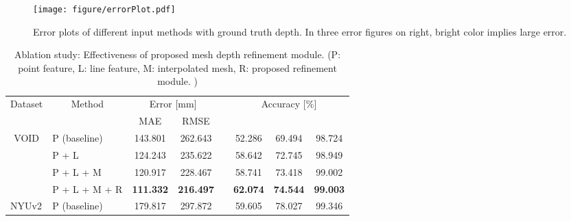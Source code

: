 \begin{figure}[t!]
\centering
    \texttt{[image: figure/errorPlot.pdf]}
    \caption{Error plot\textcolor{color1}{s} of different input method\textcolor{color1}{s} with ground truth depth. In three error figures on right, \textcolor{color1}{bright color implies large} error.} 
    \label{fig:error_plot}
    \vspace{-0.3cm}
\end{figure} 
\begin{table}[t!]
\centering
\renewcommand{\arraystretch}{1.1} \renewcommand{\tabcolsep}{1.1mm}  \caption{Ablation study: Effectiveness of \textcolor{color1}{p}roposed \textcolor{color1}{m}esh \textcolor{color1}{d}epth \textcolor{color1}{r}efinement module. 
(P: point feature, L: line feature, M: interpolated mesh, R: \textcolor{color1}{p}roposed refinement module.
)}
\begin{tabular}[ht]{clcccccc}
\hline
\multirow{2}{*}{Dataset}                   & \multicolumn{1}{c}{\multirow{2}{*}{Method}} & \multicolumn{2}{c}{Error {[}mm{]} } &  & \multicolumn{3}{c}{Accuracy {[}\%{]} }    \\ \cline{3-4} \cline{6-8} 
                                          & \multicolumn{1}{c}{}                        & MAE                    & RMSE                   &  &       &       &       \\ \hline
\multirow{4}{*}{VOID}                      & P (baseline)                                & 143.801                & 262.643                &  & 52.286          & 69.494          & 98.724          \\
                                          & P + L                                       & 124.243                & 235.622                &  & 58.642          & 72.745          & 98.949          \\
                                          & P + L + M                                   & 120.917                & 228.467                &  & 58.741          & 73.418          & 99.002          \\
                                          & P + L + M + R                               & \textbf{111.332}       & \textbf{216.497}       &  & \textbf{62.074} & \textbf{74.544} & \textbf{99.003} \\ \hline
\multicolumn{1}{l}{\multirow{4}{*}{NYUv2}} & P (baseline)                                & 179.817                & 297.872                &  & 59.605          & 78.027          & 99.346          \\

\end{tabular}
\end{table}
